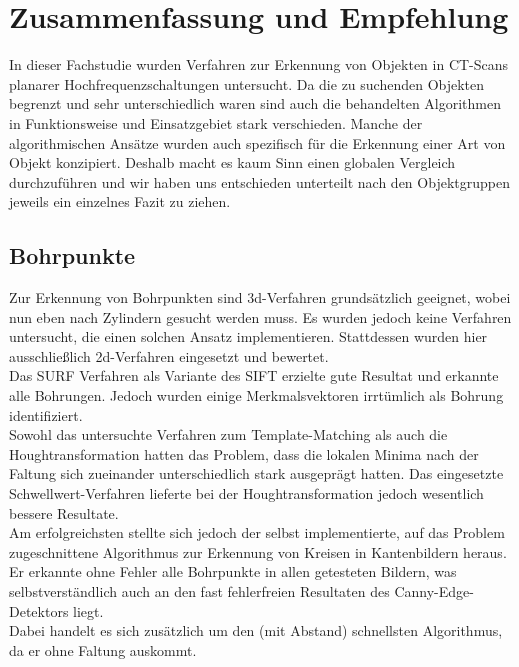 
\chapter{Zusammenfassung und Empfehlung}\label{chap:zusfas}
In dieser Fachstudie wurden Verfahren zur Erkennung von Objekten in CT-Scans planarer Hochfrequenzschaltungen untersucht. Da die zu suchenden Objekten begrenzt und sehr unterschiedlich waren sind auch die behandelten Algorithmen in Funktionsweise und Einsatzgebiet stark verschieden. Manche der algorithmischen Ansätze wurden auch spezifisch für die Erkennung einer Art von Objekt konzipiert. Deshalb macht es kaum Sinn einen globalen Vergleich durchzuführen und wir haben uns entschieden unterteilt nach den Objektgruppen jeweils ein einzelnes Fazit zu ziehen.
\section{Bohrpunkte}
Zur Erkennung von Bohrpunkten sind 3d-Verfahren grundsätzlich geeignet, wobei nun eben nach Zylindern gesucht werden muss. Es wurden jedoch keine Verfahren untersucht, die einen solchen Ansatz implementieren. Stattdessen wurden hier ausschließlich 2d-Verfahren eingesetzt und bewertet. \\
Das SURF Verfahren als Variante des SIFT erzielte gute Resultat und erkannte alle Bohrungen. Jedoch wurden einige Merkmalsvektoren irrtümlich als Bohrung identifiziert. \\
Sowohl das untersuchte Verfahren zum Template-Matching als auch die Houghtransformation hatten das Problem, dass die lokalen Minima nach der Faltung sich zueinander unterschiedlich stark ausgeprägt hatten. Das eingesetzte Schwellwert-Verfahren lieferte bei der Houghtransformation jedoch wesentlich bessere Resultate.\\
Am erfolgreichsten stellte sich jedoch der selbst implementierte, auf das Problem zugeschnittene Algorithmus zur Erkennung von Kreisen in Kantenbildern heraus.\\
Er erkannte ohne Fehler alle Bohrpunkte in allen getesteten Bildern, was selbstverständlich auch an den fast fehlerfreien Resultaten des Canny-Edge-Detektors liegt. \\
Dabei handelt es sich zusätzlich um den (mit Abstand) schnellsten Algorithmus, da er ohne Faltung auskommt.
